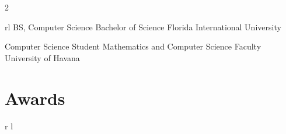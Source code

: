 \documentclass[10pt]{article} %
\begin{document}
\begin{paracol}{2}
\begin{supertabular}{rl}
	{BS, Computer Science} %
	{} %
	{Bachelor of Science} %
	{Florida International University} %
	
	{Computer Science Student} %
	{} %
	{Mathematics and Computer Science Faculty} %
	{University of Havana} %
	

\end{supertabular}


\section{Awards}


\begin{supertabular}{r l} %
	
	
	
	
	
	
	
\end{supertabular}



\end{paracol}
\end{document}
